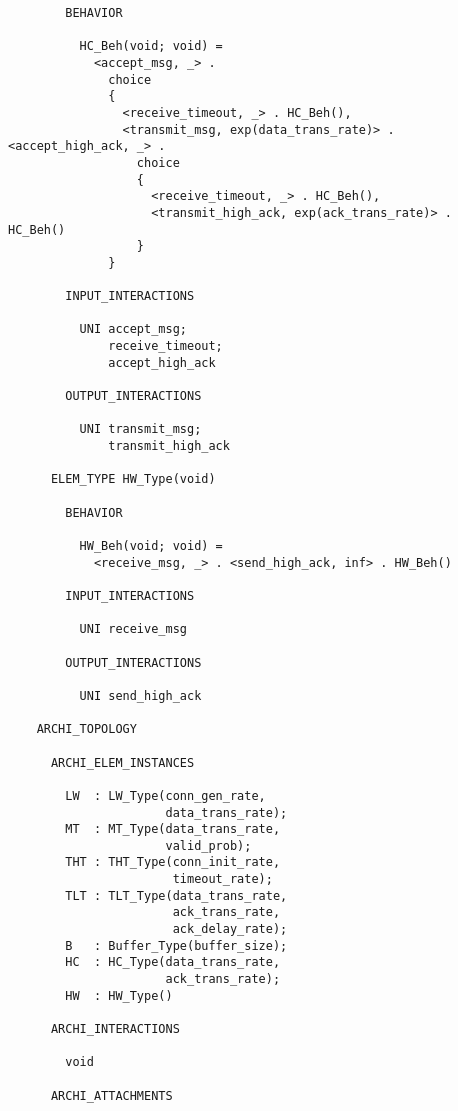 \begin{verbatim}
        BEHAVIOR

          HC_Beh(void; void) =
            <accept_msg, _> .
              choice
              {
                <receive_timeout, _> . HC_Beh(),
                <transmit_msg, exp(data_trans_rate)> . <accept_high_ack, _> .
                  choice
                  {
                    <receive_timeout, _> . HC_Beh(),
                    <transmit_high_ack, exp(ack_trans_rate)> . HC_Beh()
                  }
              }

        INPUT_INTERACTIONS

          UNI accept_msg;
              receive_timeout;
              accept_high_ack

        OUTPUT_INTERACTIONS

          UNI transmit_msg;
              transmit_high_ack

      ELEM_TYPE HW_Type(void)

        BEHAVIOR

          HW_Beh(void; void) =
            <receive_msg, _> . <send_high_ack, inf> . HW_Beh()

        INPUT_INTERACTIONS

          UNI receive_msg

        OUTPUT_INTERACTIONS

          UNI send_high_ack

    ARCHI_TOPOLOGY

      ARCHI_ELEM_INSTANCES

        LW  : LW_Type(conn_gen_rate,
                      data_trans_rate);
        MT  : MT_Type(data_trans_rate,
                      valid_prob);
        THT : THT_Type(conn_init_rate,
                       timeout_rate);
        TLT : TLT_Type(data_trans_rate,
                       ack_trans_rate,
                       ack_delay_rate);
        B   : Buffer_Type(buffer_size);
        HC  : HC_Type(data_trans_rate,
                      ack_trans_rate);
        HW  : HW_Type()

      ARCHI_INTERACTIONS

        void

      ARCHI_ATTACHMENTS


\end{verbatim}
